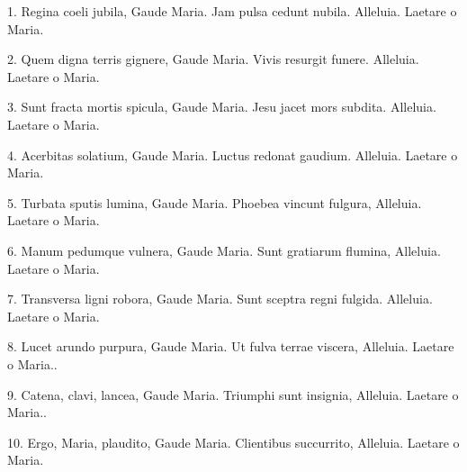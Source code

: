 
1. Regina coeli jubila, Gaude Maria.
Jam pulsa cedunt nubila.
Alleluia. Laetare o Maria.

2. Quem digna terris gignere, Gaude Maria.
Vivis resurgit funere.
Alleluia. Laetare o Maria.

3. Sunt fracta mortis spicula, Gaude Maria.
Jesu jacet mors subdita.
Alleluia. Laetare o Maria.

4. Acerbitas solatium, Gaude Maria.
Luctus redonat gaudium.
Alleluia. Laetare o Maria.

5. Turbata sputis lumina, Gaude Maria.
Phoebea vincunt fulgura,
Alleluia. Laetare o Maria.

6. Manum pedumque vulnera, Gaude Maria.
Sunt gratiarum flumina,
Alleluia. Laetare o Maria.

7. Transversa ligni robora, Gaude Maria.
Sunt sceptra regni fulgida.
Alleluia. Laetare o Maria.

8. Lucet arundo purpura, Gaude Maria.
Ut fulva terrae viscera,
Alleluia. Laetare o Maria..

9. Catena, clavi, lancea, Gaude Maria.
Triumphi sunt insignia,
Alleluia. Laetare o Maria..

10. Ergo, Maria, plaudito, Gaude Maria.
Clientibus succurrito,
Alleluia. Laetare o Maria.
